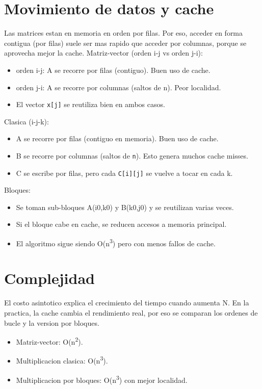 \documentclass[11pt]{article}
\begin{document}
\section*{Movimiento de datos y cache}
Las matrices estan en memoria en orden por filas. Por eso, acceder en forma contigua (por filas) suele ser mas rapido que acceder por columnas, porque se aprovecha mejor la cache.
Matriz-vector (orden i-j vs orden j-i):
\begin{itemize}
  \item orden i-j: A se recorre por filas (contiguo). Buen uso de cache.
  \item orden j-i: A se recorre por columnas (saltos de n). Peor localidad.
  \item El vector \texttt{x[j]} se reutiliza bien en ambos casos.
\end{itemize}

Clasica (i-j-k):
\begin{itemize}
  \item A se recorre por filas (contiguo en memoria). Buen uso de cache.
  \item B se recorre por columnas (saltos de \texttt{n}). Esto genera muchos cache misses.
  \item C se escribe por filas, pero cada \texttt{C[i][j]} se vuelve a tocar en cada k.
\end{itemize}

Bloques:
\begin{itemize}
  \item Se toman sub-bloques A(i0,k0) y B(k0,j0) y se reutilizan varias veces.
  \item Si el bloque cabe en cache, se reducen accesos a memoria principal.
  \item El algoritmo sigue siendo O(n\textsuperscript{3}) pero con menos fallos de cache.
\end{itemize}

\section*{Complejidad}
El costo asintotico explica el crecimiento del tiempo cuando aumenta N. En la practica, la cache cambia el rendimiento real, por eso se comparan los ordenes de bucle y la version por bloques.
\begin{itemize}
  \item Matriz-vector: O(n\textsuperscript{2}).
  \item Multiplicacion clasica: O(n\textsuperscript{3}).
  \item Multiplicacion por bloques: O(n\textsuperscript{3}) con mejor localidad.
\end{itemize}
\end{document}
